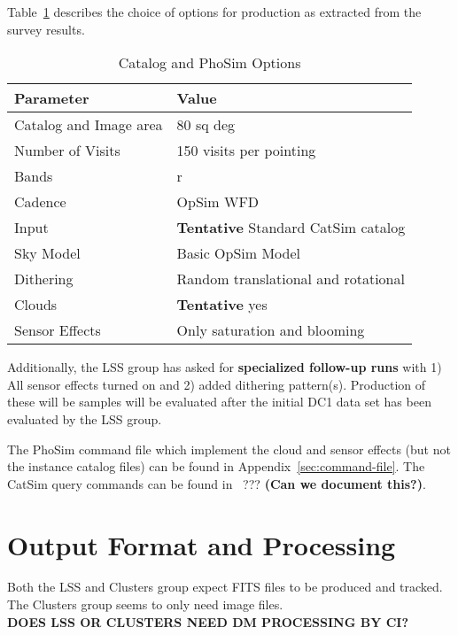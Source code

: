 \documentclass[12pt,letterpaper]{article}
\begin{document}
Table~\ref{tab:phosim-options} describes the choice of options for
production as extracted from the survey results.

\begin{table}[!htb]
  \centering
  \begin{tabular}{| l| l| }
    \hline 
    Parameter                       & Value   \\
    \hline
    Catalog and Image area  & 80 sq deg \\
    Number of Visits            & 150 visits per pointing \\
    Bands                             & r   \\
    Cadence                         & OpSim WFD  \\
    Input                              & {\bf Tentative} Standard CatSim catalog \\
    Sky Model                      & Basic OpSim Model \\
    Dithering                       & Random translational and rotational  \\
    Clouds                           & {\bf Tentative} yes \\
    Sensor Effects                & Only saturation and blooming \\
    \hline
  \end{tabular}
  \caption{Catalog and PhoSim Options}
  \label{tab:phosim-options}
\end{table}

Additionally, the LSS group has asked for {\bf specialized follow-up
  runs} with 1) All sensor effects turned on and 2) added dithering
pattern(s).  Production of these will be samples will be evaluated
after the initial DC1 data set has been evaluated by the LSS group.

The PhoSim command file which implement the cloud and sensor effects (but not the
instance catalog files) can be found in Appendix~\ref{sec:command-file}.  The
CatSim query commands can be found in~ ??? {\bf (Can we document this?)}.

\section{Output Format and Processing}

Both the LSS and Clusters group expect FITS files to be produced and
tracked.  The Clusters group seems to only need image files.  \\

\noindent
{\bf DOES LSS OR CLUSTERS NEED DM PROCESSING BY CI?} \\
 
\end{document}
